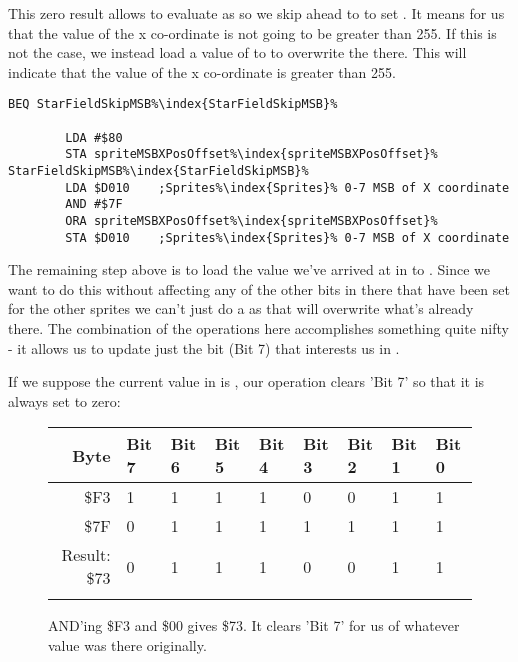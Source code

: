 This zero result allows  to evaluate as  so we skip ahead to 
to set .
It means for us that the value of the x co-ordinate is not going to be greater than 255. If this is not the case, we instead load a value of
 to  to overwrite the  there. This will indicate that the value of the x co-ordinate
is greater than 255.

\begin{lstlisting}[escapechar=\%]
        BEQ StarFieldSkipMSB%\index{StarFieldSkipMSB}%

        LDA #$80
        STA spriteMSBXPosOffset%\index{spriteMSBXPosOffset}%
StarFieldSkipMSB%\index{StarFieldSkipMSB}%   
        LDA $D010    ;Sprites%\index{Sprites}% 0-7 MSB of X coordinate
        AND #$7F
        ORA spriteMSBXPosOffset%\index{spriteMSBXPosOffset}%
        STA $D010    ;Sprites%\index{Sprites}% 0-7 MSB of X coordinate
\end{lstlisting}

The remaining step above is to load the value we've arrived at in  to . Since we
want to do this without affecting any of the other bits in there that have been set for the other sprites we can't
just do a  as that will overwrite what's already there. The combination of the  operations
here accomplishes something quite nifty - it allows us to update just the bit (Bit 7) that interests us in .

If we suppose the current value in  is , our  operation clears 'Bit 7' so that
it is always set to zero:

\begin{figure}[H]
  {
    \setlength{\tabcolsep}{3.0pt}
    \setlength\cmidrulewidth{\heavyrulewidth} %
    \begin{adjustbox}{width=10cm,center}

      \begin{tabular}{rllllllll}
        \toprule
        Byte & Bit 7 & Bit 6 & Bit 5 & Bit 4 & Bit 3 & Bit 2 & Bit 1 & Bit 0        \\
        \midrule
        \$F3 & 1 & 1 & 1 & 1 & 0 & 0 & 1 & 1 \\
        \$7F & 0 & 1 & 1 & 1 & 1 & 1 & 1 & 1 \\
        \midrule
        Result: \$73 & 0 & 1 & 1 & 1 & 0 & 0 & 1 & 1 \\
        \addlinespace
        \bottomrule
      \end{tabular}
    \end{adjustbox}
  }\caption*{AND'ing \$F3 and \$00 gives \$73. It clears 'Bit 7' for us of whatever value was there originally.}
\end{figure}

